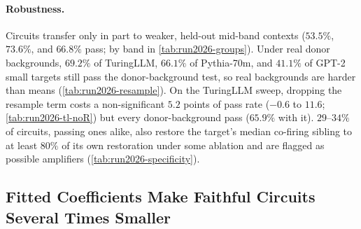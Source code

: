 \documentclass[10pt]{article}
\begin{document}
\paragraph{Robustness.}
Circuits transfer only in part to weaker, held-out mid-band contexts ($53.5\%$, $73.6\%$, and $66.8\%$ pass; by band in \cref{tab:run2026-groups}).
Under real donor backgrounds, $69.2\%$ of TuringLLM, $66.1\%$ of Pythia-70m, and $41.1\%$ of GPT-2 small targets still pass the donor-background test, so real backgrounds are harder than means (\cref{tab:run2026-resample}).
On the TuringLLM sweep, dropping the resample term costs a non-significant $5.2$ points of pass rate ($-0.6$ to $11.6$; \cref{tab:run2026-tl-noR}) but every donor-background pass ($65.9\%$ with it).
$29$--$34\%$ of circuits, passing ones alike, also restore the target's median co-firing sibling to at least $80\%$ of its own restoration under some ablation and are flagged as possible amplifiers (\cref{tab:run2026-specificity}).


\subsection{Fitted Coefficients Make Faithful Circuits Several Times Smaller}
\label{sec:weighted}
\end{document}
